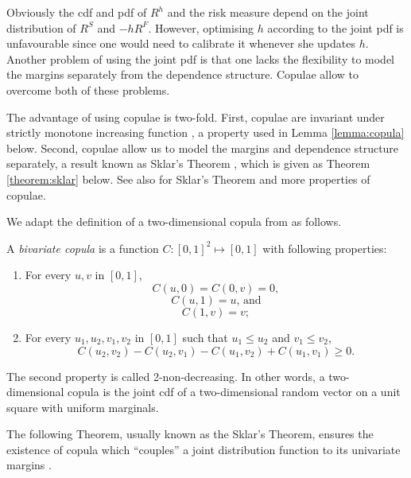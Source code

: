 Obviously the cdf and pdf of $R^h$ and the risk measure depend on the
joint distribution of $R^S$ and $-hR^F$. However, optimising $h$
according to the joint pdf is unfavourable since one would need to
calibrate it whenever she updates $h$.
Another problem of using the joint pdf is that one lacks the
flexibility to model the margins separately from the dependence
structure. Copulae allow to overcome both of these problems. 

The advantage of using copulae is two-fold.
First, copulae are invariant under strictly
monotone increasing function \citep{schweizer1981nonparametric}, a
property used in Lemma \ref{lemma:copula} below. 
Second, copulae allow us to model the margins and dependence structure 
separately, a result known as Sklar's Theorem \citep{Sklar1959}, which
is given as Theorem \ref{theorem:sklar} below. 
See also \citep{Nelsen1999, joe1997multivariate, McNeil2005} for
Sklar's Theorem and more properties of copulae.

We adapt the definition of a two-dimensional copula from
\citep{Nelsen1999} as follows.

\begin{defi} 
  A {\em bivariate copula} is a function $C: [0,1]^2 \mapsto [0,1]$ with following properties:
  \begin{enumerate}
    \item For every $u,v$ in $[0,1]$,
      \[C(u,0)= C(0,v)=0, \]
    \[C(u,1)= u \text{, and}\]
    \[C(1,v)= v;\]
    \item For every $u_1,u_2, v_1, v_2$ in $[0,1]$ such that $u_1 \leq u_2$ and $v_1 \leq v_2$,
    \[C(u_2,v_2)-C(u_2,v_1)-C(u_1, v_2)+C(u_1,v_1) \geq 0.\]
  \end{enumerate}
  \end{defi}

The second property is called 2-non-decreasing.
In other words, a two-dimensional copula is the joint cdf of a two-dimensional random vector
on a unit square with uniform marginals.

The following Theorem, usually known as the Sklar's
Theorem, ensures the existence of copula which “couples” a 
joint distribution function to its univariate margins \citep[Theorem 2.3.3.]{Nelsen1999}.


